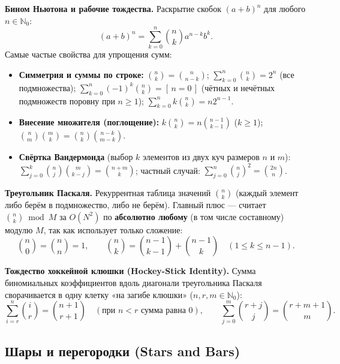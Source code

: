 \documentclass[10pt,a4paper]{article}
\renewcommand{\le}{\leqslant}
\renewcommand{\ge}{\geqslant}
\newcommand{\N}{\mathbb{N}}
\newcommand{\iverson}[1]{[\,#1\,]}
\begin{document}
\textbf{Бином Ньютона и рабочие тождества.} Раскрытие скобок $(a + b)^n$ для любого $n \in \N_0$:
\[
  (a + b)^n = \sum_{k=0}^{n} \binom{n}{k} a^{n-k} b^k.
\]
Самые частые свойства для упрощения сумм:
\begin{itemize}
  \item \textbf{Симметрия и суммы по строке:} $\binom{n}{k} = \binom{n}{n-k}$; $\sum_{k=0}^n \binom{n}{k} = 2^n$ (все подмножества); $\sum_{k=0}^n (-1)^k \binom{n}{k} = \iverson{n = 0}$ (чётных и нечётных подмножеств поровну при $n \ge 1$); $\sum_{k=0}^n k\binom{n}{k} = n 2^{n-1}$.
  \item \textbf{Внесение множителя (поглощение):} $k\binom{n}{k} = n\binom{n-1}{k-1}$ ($k \ge 1$); $\binom{n}{m}\binom{m}{k} = \binom{n}{k}\binom{n-k}{m-k}$.
  \item \textbf{Свёртка Вандермонда} (выбор $k$ элементов из двух куч размеров $n$ и $m$): $\sum_{j=0}^{k} \binom{n}{j}\binom{m}{k-j} = \binom{n+m}{k}$; частный случай: $\sum_{j=0}^n \binom{n}{j}^2 = \binom{2n}{n}$.
\end{itemize}

\textbf{Треугольник Паскаля.} Рекуррентная таблица значений $\binom{n}{k}$ (каждый элемент либо берём в подмножество, либо не берём). Главный плюс — считает $\binom{n}{k} \bmod M$ за $O(N^2)$ по \textbf{абсолютно любому} (в том числе составному) модулю $M$, так как использует только сложение:
\[
  \binom{n}{0} = \binom{n}{n} = 1, \qquad \binom{n}{k} = \binom{n-1}{k-1} + \binom{n-1}{k} \quad (1 \le k \le n - 1).
\]

\textbf{Тождество хоккейной клюшки (Hockey-Stick Identity).} Сумма биномиальных коэффициентов вдоль диагонали треугольника Паскаля сворачивается в одну клетку «на загибе клюшки» ($n, r, m \in \N_0$):
\[
  \sum_{i=r}^{n} \binom{i}{r} = \binom{n+1}{r+1} \quad (\text{при } n < r \text{ сумма равна } 0), \qquad
  \sum_{j=0}^{m} \binom{r+j}{j} = \binom{r+m+1}{m}.
\]

\subsection{Шары и перегородки (Stars and Bars)}
\end{document}
